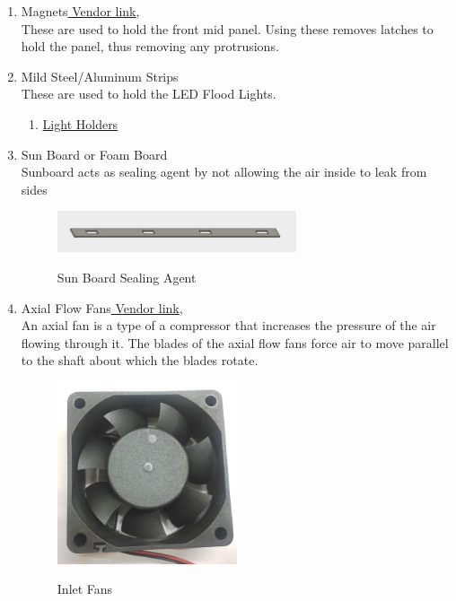 \documentclass[a4paper,12pt,oneside]{book}
\begin{document}
\begin{enumerate}
\begin{enumerate}
  \end{enumerate}
  \item Magnets\href{http://www.amazon.in/Perfect-Magnets-Nickel-Coated-Pieces/dp/B01LY18VN3/ref=sr_1_7?ie=UTF8&qid=1499193943&sr=8-7&keywords=magnets}{ Vendor link},\\
  These are used to hold the front mid panel. Using these removes latches to hold the panel, thus removing any protrusions. 
  \item Mild Steel/Aluminum Strips\\
  These are used to hold the LED Flood Lights.
  \begin{enumerate}
  \item \href{http://a360.co/2sGs5DH}{Light Holders}
   \end{enumerate}
  \item Sun Board or Foam Board\\
   Sunboard acts as sealing agent by not allowing the air inside to leak from sides
  \begin{figure}[h!] \begin{center}
  \includegraphics[width=200pt]{sunBoard}\\
  \caption{Sun Board Sealing Agent}
  \end{center}\end{figure}

  \item Axial Flow Fans\href{http://www.amazon.in/60x60x25mm-Brushless-12V-Cooling-Fan/dp/B01MS9AHPC/ref=sr_1_99?ie=UTF8&qid=1499194646&sr=8-99&keywords=dc+fans+12v}{ Vendor link},\\
  An axial fan is a type of a compressor that increases the pressure of the air flowing through it. The blades of the axial flow fans force air to move parallel to the shaft about which the blades rotate.\\
  \begin{figure}[h!]\begin{center}
  \includegraphics[width=150pt]{Fan60x60x25}\\
  \caption{Inlet Fans}
  \end{center}\end{figure}
  

\end{enumerate}
\end{document}
